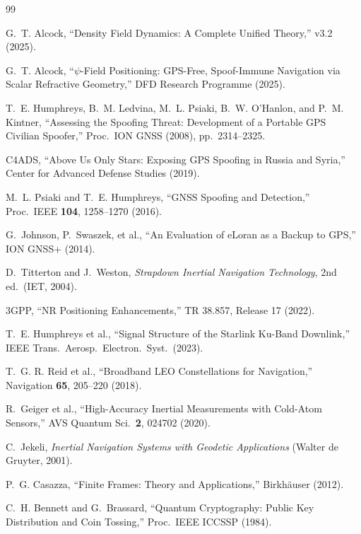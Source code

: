 \documentclass[twocolumn,superscriptaddress,prd,nofootinbib]{revtex4-2}
\begin{document}
\begin{thebibliography}{99}

G.~T. Alcock, ``Density Field Dynamics: A Complete Unified Theory,''
v3.2 (2025).

G.~T. Alcock, ``$\psi$-Field Positioning: GPS-Free, Spoof-Immune
Navigation via Scalar Refractive Geometry,'' DFD Research Programme (2025).

T.~E. Humphreys, B.~M. Ledvina, M.~L. Psiaki, B.~W. O'Hanlon, and
P.~M. Kintner, ``Assessing the Spoofing Threat: Development of a
Portable GPS Civilian Spoofer,'' Proc.\ ION GNSS (2008), pp.\ 2314--2325.

C4ADS, ``Above Us Only Stars: Exposing GPS Spoofing in Russia and
Syria,'' Center for Advanced Defense Studies (2019).

M.~L. Psiaki and T.~E. Humphreys, ``GNSS Spoofing and Detection,''
Proc.\ IEEE \textbf{104}, 1258--1270 (2016).

G.~Johnson, P.~Swaszek, et al., ``An Evaluation of eLoran as a Backup
to GPS,'' ION GNSS+ (2014).

D.~Titterton and J.~Weston, \textit{Strapdown Inertial Navigation
Technology}, 2nd ed.\ (IET, 2004).

3GPP, ``NR Positioning Enhancements,'' TR 38.857, Release 17 (2022).

T.~E. Humphreys et al., ``Signal Structure of the Starlink Ku-Band
Downlink,'' IEEE Trans.\ Aerosp.\ Electron.\ Syst.\ (2023).

T.~G. R. Reid et al., ``Broadband LEO Constellations for Navigation,''
Navigation \textbf{65}, 205--220 (2018).

R.~Geiger et al., ``High-Accuracy Inertial Measurements with Cold-Atom
Sensors,'' AVS Quantum Sci.\ \textbf{2}, 024702 (2020).

C.~Jekeli, \textit{Inertial Navigation Systems with Geodetic
Applications} (Walter de Gruyter, 2001).

P.~G. Casazza, ``Finite Frames: Theory and Applications,''
Birkh\"auser (2012).

C.~H. Bennett and G.~Brassard, ``Quantum Cryptography: Public Key
Distribution and Coin Tossing,'' Proc.\ IEEE ICCSSP (1984).


\end{thebibliography}
\end{document}
